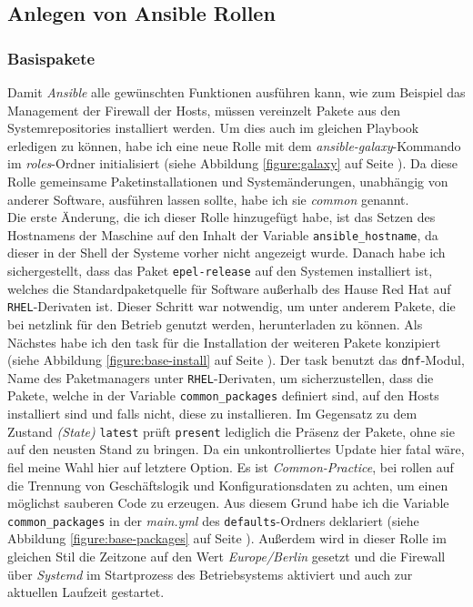 \documentclass[11pt,a4paper]{article}
\begin{document}
\subsection{Anlegen von Ansible Rollen}
\subsubsection{Basispakete}
Damit \emph{Ansible} alle gewünschten Funktionen ausführen kann, wie zum Beispiel
das Management der Firewall der Hosts, müssen vereinzelt Pakete aus den Systemrepositories
installiert werden. Um dies auch im gleichen Playbook  erledigen zu können,
habe ich eine neue Rolle  mit dem \emph{ansible-galaxy}-Kommando
im \emph{roles}-Ordner initialisiert (siehe Abbildung \ref{figure:galaxy} auf Seite \pageref{figure:galaxy}). Da diese Rolle gemeinsame Paketinstallationen
und Systemänderungen, unabhängig von anderer Software,
ausführen lassen sollte, habe ich sie \emph{common} genannt. \\
Die erste Änderung, die ich dieser Rolle hinzugefügt habe, ist das Setzen des Hostnamens der Maschine
auf den Inhalt der Variable \verb|ansible_hostname|, da dieser in der Shell der
Systeme vorher nicht angezeigt wurde. Danach habe ich sichergestellt, dass das Paket
\verb|epel-release| auf den Systemen installiert ist, welches die Standardpaketquelle
für Software außerhalb des Hause Red Hat auf \verb|RHEL|-Derivaten ist.
Dieser Schritt war notwendig, um unter anderem Pakete, die bei \gls{netzlink} für den
Betrieb genutzt werden, herunterladen zu können. Als Nächstes habe ich den \gls{task}
für die Installation der weiteren Pakete konzipiert (siehe Abbildung \ref{figure:base-install} auf Seite \pageref{figure:base-install}).
Der \gls{task} benutzt das \verb|dnf|-Modul, Name des Paketmanagers unter \verb|RHEL|-Derivaten,
um sicherzustellen, dass die Pakete, welche in der Variable \verb|common_packages| definiert sind, auf
den Hosts installiert sind und falls nicht, diese zu installieren. Im Gegensatz zu dem Zustand \emph{(State)}
\verb|latest| prüft \verb|present| lediglich die Präsenz der Pakete, ohne sie auf den neusten Stand zu bringen.
Da ein unkontrolliertes Update hier fatal wäre, fiel meine Wahl hier auf letztere Option.
Es ist \emph{Common-Practice}, bei \gls{rollen} auf die Trennung von Geschäftslogik und
Konfigurationsdaten zu achten, um einen möglichst sauberen Code zu erzeugen. Aus diesem
Grund habe ich die Variable \verb|common_packages| in der \emph{main.yml} des \verb|defaults|-Ordners
deklariert (siehe Abbildung \ref{figure:base-packages} auf Seite \pageref{figure:base-packages}).
Außerdem wird in dieser Rolle im gleichen Stil die Zeitzone auf den Wert \emph{Europe/Berlin}
gesetzt und die Firewall über \emph{Systemd} im Startprozess des Betriebsystems aktiviert und auch
zur aktuellen Laufzeit gestartet.
\end{document}
